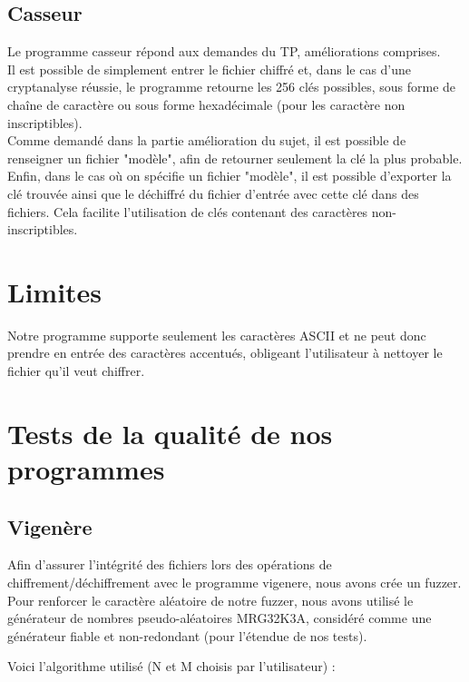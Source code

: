 \documentclass[a4paper, 11pt, oneside]{article}
\begin{document}
\subsection{Casseur}

Le programme casseur répond aux demandes du TP, améliorations comprises.\\
Il est possible de simplement entrer le fichier chiffré et, dans le cas d'une cryptanalyse réussie, le programme retourne les 256 clés possibles, sous forme de chaîne de caractère ou sous forme hexadécimale (pour les caractère non inscriptibles).\\
Comme demandé dans la partie amélioration du sujet, il est possible de renseigner un fichier "modèle", afin de retourner seulement la clé la plus probable.\\
Enfin, dans le cas où on spécifie un fichier "modèle", il est possible d'exporter la clé trouvée ainsi que le déchiffré du fichier d'entrée avec cette clé dans des fichiers. Cela facilite l'utilisation de clés contenant des caractères non-inscriptibles.

\section{Limites}

Notre programme supporte seulement les caractères ASCII et ne peut donc prendre en entrée des caractères accentués, obligeant l'utilisateur à nettoyer le fichier qu'il veut chiffrer.

\section{Tests de la qualité de nos programmes}

\subsection{Vigenère}

Afin d'assurer l'intégrité des fichiers lors des opérations de chiffrement/déchiffrement avec le programme vigenere, nous avons crée un fuzzer.\\
Pour renforcer le  caractère aléatoire de notre fuzzer, nous avons utilisé le générateur de nombres pseudo-aléatoires MRG32K3A, considéré comme une générateur fiable et non-redondant (pour l'étendue de nos tests).

Voici l'algorithme utilisé (N et M choisis par l'utilisateur) :\\
\end{document}
